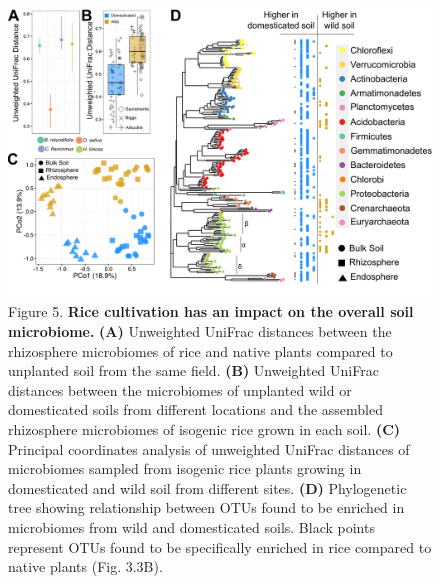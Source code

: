 \begin{figure}[h]
\centering
\includegraphics[width=6in]{Figures/figure2_5}
\caption[Figure 3.5]{Figure 5. \textbf{Rice cultivation has an impact on the overall soil microbiome.} \textbf{(A)} Unweighted UniFrac distances between the rhizosphere microbiomes of rice and native plants compared to unplanted soil from the same field. \textbf{(B)} Unweighted UniFrac distances between the microbiomes of unplanted wild or domesticated soils from different locations and the assembled rhizosphere microbiomes of isogenic rice grown in each soil. \textbf{(C)} Principal coordinates analysis of unweighted UniFrac distances of microbiomes sampled from isogenic rice plants growing in domesticated and wild soil from different sites. \textbf{(D)} Phylogenetic tree showing relationship between OTUs found to be enriched in microbiomes from wild and domesticated soils. Black points represent OTUs found to be specifically enriched in rice compared to native plants (Fig. 3.3B).}
\label{Figure 3.5}
\end{figure}

